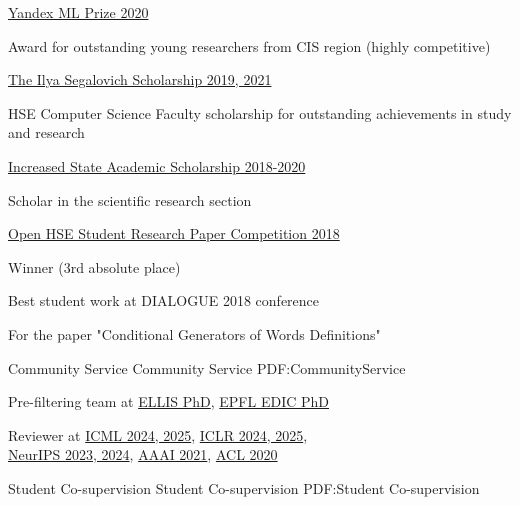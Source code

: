 \documentclass[letterpaper,MMMyyyy,nonstopmode]{simpleresumecv}
\begin{document}
\begin{Body}
\Entry
\href{https://yandex.com/scholarships/}{Yandex ML Prize 2020}
\begin{Detail}
Award for outstanding young researchers from CIS region (highly competitive)
\end{Detail}
\Gap

\Entry
\href{https://cs.hse.ru/en/stipend/}{The Ilya Segalovich Scholarship 2019, 2021}
\begin{Detail}
HSE Computer Science Faculty scholarship for outstanding achievements in study and research
\end{Detail}
\Gap

\Entry
\href{https://www.hse.ru/en/scholarships/academic_raised_demo}{Increased State Academic Scholarship 2018-2020}
\begin{Detail}
Scholar in the scientific research section
\end{Detail}
\Gap

\Entry
\href{https://nirs.hse.ru/nirs/}{Open HSE Student Research Paper Competition 2018}
\begin{Detail}
Winner (3rd absolute place)
\end{Detail}
\Gap

\Entry
Best student work at DIALOGUE 2018 conference
\begin{Detail}
For the paper "Conditional Generators of Words Definitions"
\end{Detail}

\newpage


\Section
{Community Service}
{Community Service}
{PDF:CommunityService}

\Entry
Pre-filtering team at \href{https://ellis.eu}{ELLIS PhD}, \href{https://www.epfl.ch/education/phd/edic-computer-and-communication-sciences/}{EPFL EDIC PhD}
\Gap

\Entry
Reviewer at \href{https://icml.cc}{ICML 2024, 2025}, \href{https://iclr.cc}{ICLR 2024, 2025}, \\
\href{https://neurips.cc}{NeurIPS 2023, 2024}, \href{https://aaai.org/Conferences/AAAI-21/}{AAAI 2021}, \href{https://acl2020.org}{ACL 2020}


\Section
{Student Co-supervision}
{Student Co-supervision}
{PDF:Student Co-supervision}


\end{Body}
\end{document}
